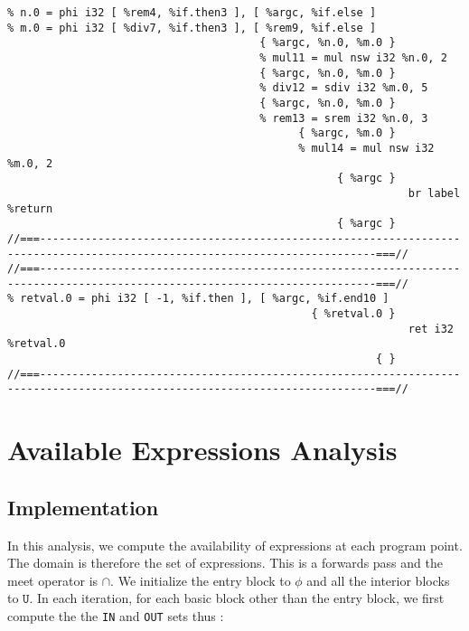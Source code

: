 \begin{verbatim}
% n.0 = phi i32 [ %rem4, %if.then3 ], [ %argc, %if.else ]
% m.0 = phi i32 [ %div7, %if.then3 ], [ %rem9, %if.else ]
                                       { %argc, %n.0, %m.0 }
                                       % mul11 = mul nsw i32 %n.0, 2
                                       { %argc, %n.0, %m.0 }
                                       % div12 = sdiv i32 %m.0, 5
                                       { %argc, %n.0, %m.0 }
                                       % rem13 = srem i32 %n.0, 3
                                             { %argc, %m.0 }
                                             % mul14 = mul nsw i32 %m.0, 2
                                                   { %argc }
                                                              br label %return
                                                   { %argc }
//===--------------------------------------------------------------------------------------------------------------------------===//
//===--------------------------------------------------------------------------------------------------------------------------===//
% retval.0 = phi i32 [ -1, %if.then ], [ %argc, %if.end10 ]
                                               { %retval.0 }
                                                              ret i32 %retval.0
                                                         { }
//===--------------------------------------------------------------------------------------------------------------------------===//
\end{verbatim}
\endgroup

\section{Available Expressions Analysis}

\subsection{Implementation}

In this analysis, we compute the availability of expressions at each program point.
The domain is therefore the set of expressions.
This is a forwards pass and the meet operator is $\cap$.
We initialize the entry block to $\phi$  and all the interior blocks to $\mathtt{U}$.
In each iteration, for each basic block other than the entry block, we
first compute the the \texttt{IN} and \texttt{OUT} sets thus :

\begin{align*}
\end{align*}

